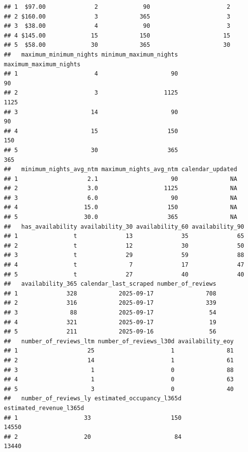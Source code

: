 \documentclass[
]{article}
\begin{document}
\begin{verbatim}
## 1  $97.00              2             90                      2
## 2 $160.00              3            365                      3
## 3  $38.00              4             90                      3
## 4 $145.00             15            150                     15
## 5  $58.00             30            365                     30
##   maximum_minimum_nights minimum_maximum_nights maximum_maximum_nights
## 1                      4                     90                     90
## 2                      3                   1125                   1125
## 3                     14                     90                     90
## 4                     15                    150                    150
## 5                     30                    365                    365
##   minimum_nights_avg_ntm maximum_nights_avg_ntm calendar_updated
## 1                    2.1                     90               NA
## 2                    3.0                   1125               NA
## 3                    6.0                     90               NA
## 4                   15.0                    150               NA
## 5                   30.0                    365               NA
##   has_availability availability_30 availability_60 availability_90
## 1                t              13              35              65
## 2                t              12              30              50
## 3                t              29              59              88
## 4                t               7              17              47
## 5                t              27              40              40
##   availability_365 calendar_last_scraped number_of_reviews
## 1              328            2025-09-17               708
## 2              316            2025-09-17               339
## 3               88            2025-09-17                54
## 4              321            2025-09-17                19
## 5              211            2025-09-16                56
##   number_of_reviews_ltm number_of_reviews_l30d availability_eoy
## 1                    25                      1               81
## 2                    14                      1               61
## 3                     1                      0               88
## 4                     1                      0               63
## 5                     3                      0               40
##   number_of_reviews_ly estimated_occupancy_l365d estimated_revenue_l365d
## 1                   33                       150                   14550
## 2                   20                        84                   13440

\end{verbatim}
\end{document}
